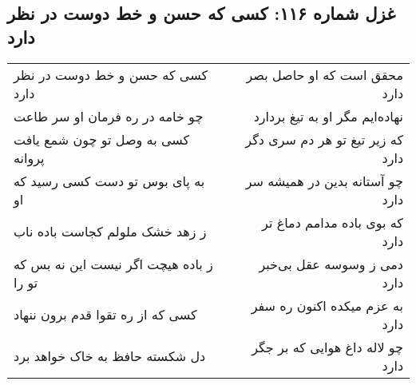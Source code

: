 \begin{center}
\section*{غزل شماره ۱۱۶: کسی که حسن و خط دوست در نظر دارد}
\label{sec:sh116}
\begin{longtable}{l p{0.5cm} r}
کسی که حسن و خط دوست در نظر دارد
&&
محقق است که او حاصل بصر دارد
\\
چو خامه در ره فرمان او سر طاعت
&&
نهاده‌ایم مگر او به تیغ بردارد
\\
کسی به وصل تو چون شمع یافت پروانه
&&
که زیر تیغ تو هر دم سری دگر دارد
\\
به پای بوس تو دست کسی رسید که او
&&
چو آستانه بدین در همیشه سر دارد
\\
ز زهد خشک ملولم کجاست باده ناب
&&
که بوی باده مدامم دماغ تر دارد
\\
ز باده هیچت اگر نیست این نه بس که تو را
&&
دمی ز وسوسه عقل بی‌خبر دارد
\\
کسی که از ره تقوا قدم برون ننهاد
&&
به عزم میکده اکنون ره سفر دارد
\\
دل شکسته حافظ به خاک خواهد برد
&&
چو لاله داغ هوایی که بر جگر دارد
\\
\end{longtable}
\end{center}
